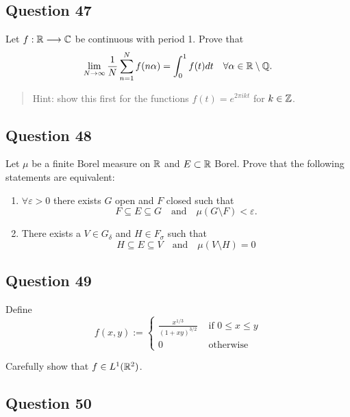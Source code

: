\documentclass[12pt]{article}
\providecommand{\tightlist}{%
  \setlength{\itemsep}{0pt}\setlength{\parskip}{0pt}}
\begin{document}
\hypertarget{question-47-1}{%
\subsection{Question 47}\label{question-47-1}}

Let \(f: {\mathbb{R}} \longrightarrow {\mathbb{C}}\) be continuous with period 1. Prove that \[
\lim _{N \rightarrow \infty} \frac{1}{N} \sum_{n=1}^{N} f(n \alpha)=\int_{0}^{1} f(t) d t \quad \forall \alpha \in {\mathbb{R}}\setminus{\mathbb{Q}}.
\]

\begin{quote}
Hint: show this first for the functions \(f(t) = e^{2\pi i k t}\) for
\(k\in {\mathbb{Z}}\).
\end{quote}

\hypertarget{question-48-1}{%
\subsection{Question 48}\label{question-48-1}}

Let \(\mu\) be a finite Borel measure on \({\mathbb{R}}\) and \(E \subset {\mathbb{R}}\)
Borel. Prove that the following statements are equivalent:

\begin{enumerate}
\def\labelenumi{\arabic{enumi}.}
\tightlist
\item
  \(\forall \varepsilon > 0\) there exists \(G\) open and \(F\) closed
  such that \[
  F \subseteq E \subseteq G \quad \text{and} \quad \mu(G\setminus F) < \varepsilon.
  \]
\item
  There exists a \(V \in G_\delta\) and \(H \in F_\sigma\) such that \[
  H \subseteq E \subseteq V \quad \text{and}\quad \mu(V\setminus H) = 0
  \]
\end{enumerate}

\hypertarget{question-49-1}{%
\subsection{Question 49}\label{question-49-1}}

Define \[
f(x, y):=\left\{\begin{array}{ll}{\frac{x^{1 / 3}}{(1+x y)^{3 / 2}}} & {\text { if } 0 \leq x \leq y} \\ {0} & {\text { otherwise }}\end{array}\right.
\]

Carefully show that \(f \in L^1({\mathbb{R}}^2)\).

\hypertarget{question-50-1}{%
\subsection{Question 50}\label{question-50-1}}
\end{document}
